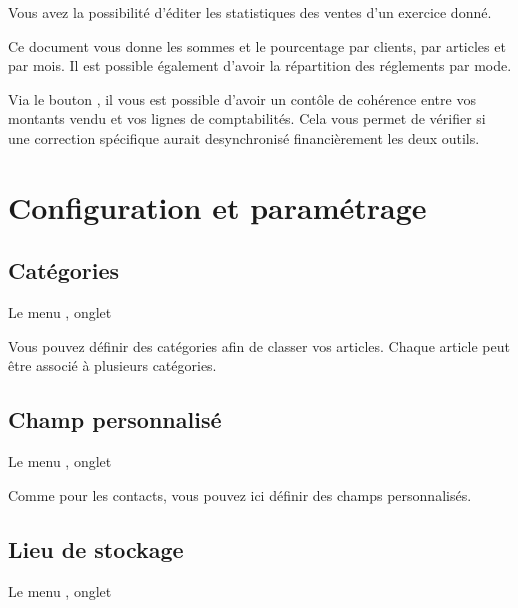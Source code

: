 \documentclass[a4paper,10pt,oneside,french]{sphinxmanual}
\begin{document}
\sphinxAtStartPar
Vous avez la possibilité d’éditer les statistiques des ventes d’un exercice donné.

\sphinxAtStartPar
Ce document vous donne les sommes et le pourcentage par clients, par articles et par mois.
Il est possible également d’avoir la répartition des réglements par mode.

\sphinxAtStartPar
Via le bouton , il vous est possible d’avoir un contôle de cohérence entre vos montants vendu et vos lignes de comptabilités.
Cela vous permet de vérifier si une correction spécifique aurait desynchronisé financièrement les deux outils.


\section{Configuration et paramétrage}
\label{\detokenize{invoice/configuration:configuration-et-parametrage}}\label{\detokenize{invoice/configuration::doc}}

\subsection{Catégories}
\label{\detokenize{invoice/configuration:categories}}
\sphinxAtStartPar
Le menu , onglet 

\sphinxAtStartPar
Vous pouvez définir des catégories afin de classer vos articles.
Chaque article peut être associé à plusieurs catégories.


\subsection{Champ personnalisé}
\label{\detokenize{invoice/configuration:champ-personnalise}}
\sphinxAtStartPar
Le menu , onglet 

\sphinxAtStartPar
Comme pour les contacts, vous pouvez ici définir des champs personnalisés.


\subsection{Lieu de stockage}
\label{\detokenize{invoice/configuration:lieu-de-stockage}}
\sphinxAtStartPar
Le menu , onglet 
\end{document}
